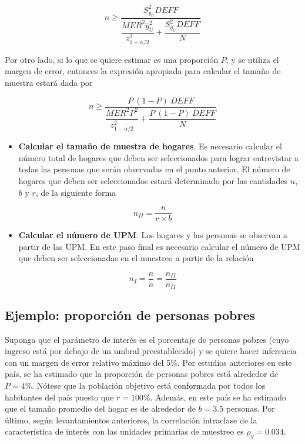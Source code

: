 \documentclass[
  12pt,
]{book}
\providecommand{\tightlist}{%
  \setlength{\itemsep}{0pt}\setlength{\parskip}{0pt}}
\begin{document}
\[
n \geq \dfrac{S^2_{y_U}DEFF}{\dfrac{MER^2 \bar{y}_U^2}{z_{1 - \alpha/2}^2}+\dfrac{S^2_{y_U}DEFF}{N}}
\]

Por otro lado, si lo que se quiere estimar es una proporción \(P\), y se utiliza el margen de error, entonces la expresión apropiada para calcular el tamaño de muestra estará dada por

\[
n \geq \dfrac{P\ (1-P)\ DEFF}{\dfrac{MER^2P^2}{z_{1-\alpha/2}^2}+\dfrac{P\ (1-P) \ DEFF}{N}}
\]

\begin{itemize}
\tightlist
\item
  \textbf{Calcular el tamaño de muestra de hogares}. Es necesario calcular el número total de hogares que deben ser seleccionados para lograr entrevistar a todas las personas que serán observadas en el punto anterior. El número de hogares que deben ser seleccionados estará determinado por las cantidades \(n\), \(b\) y \(r\), de la siguiente forma
\end{itemize}

\[
n_{II} = \dfrac{n}{r \times b}
\]

\begin{itemize}
\tightlist
\item
  \textbf{Calcular el número de UPM}. Los hogares y las personas se observan a partir de las UPM. En este paso final es necesario calcular el número de UPM que deben ser seleccionadas en el muestreo a partir de la relación
\end{itemize}

\[
n_{I} = \frac{n}{\bar{n}} 
= \frac{n_{II}}{\bar{n}_{II}}
\]

\hypertarget{ejemplo-proporciuxf3n-de-personas-pobres}{%
\subsection{Ejemplo: proporción de personas pobres}\label{ejemplo-proporciuxf3n-de-personas-pobres}}

Suponga que el parámetro de interés es el porcentaje de personas pobres (cuyo ingreso está por debajo de un umbral preestablecido) y se quiere hacer inferencia con un margen de error relativo máximo del 5\%. Por estudios anteriores en este país, se ha estimado que la proporción de personas pobres está alrededor de \(P = 4\)\%. Nótese que la población objetivo está conformada por todos los habitantes del país puesto que \(r = 100\)\%. Además, en este país se ha estimado que el tamaño promedio del hogar es de alrededor de \(b = 3.5\) personas. Por último, según levantamientos anteriores, la correlación intraclase de la característica de interés con las unidades primarias de muestreo es \(\rho_y = 0.034\).
\end{document}
